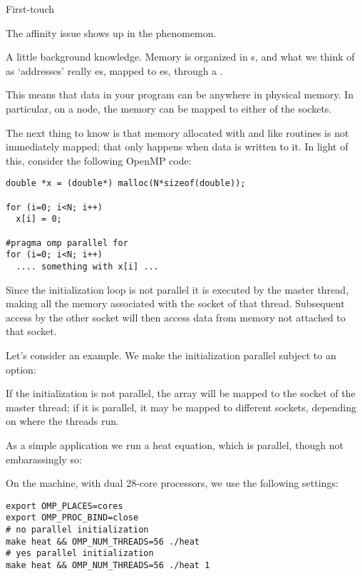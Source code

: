
 {First-touch}
\label{sec:first-touch}

The affinity issue shows up in the 
phenomemon.

A little background knowledge. Memory is organized in
s,
and what we think of as `addresses' really
es,
mapped to es,
through a .

This means that data in your program can be anywhere in physical memory.
In particular, on a  node,
the memory can be mapped to either of the sockets.

The next thing to know is that
memory allocated with  and like
routines is not immediately mapped; that only happens when data is
written to it. In light of this, consider the following OpenMP code:
\begin{lstlisting}
double *x = (double*) malloc(N*sizeof(double));

for (i=0; i<N; i++)
  x[i] = 0;

#pragma omp parallel for
for (i=0; i<N; i++)
  .... something with x[i] ...
\end{lstlisting}
Since the initialization loop is not parallel it is executed by the
master thread, making all the memory associated with the socket of
that thread. Subsequent access by the other socket will then access
data from memory not attached to that socket.

Let's consider an example. We make the initialization
parallel subject to an option:
%

If the initialization is not parallel, the array will be mapped
to the socket of the master thread; if it is parallel,
it may be mapped to different sockets, depending on where the threads run.

As a simple application
we run a heat equation, which is parallel,
though not embarassingly so:
%

On the  machine, with dual 28-core
 processors,
we use the following settings:

\begin{verbatim}
export OMP_PLACES=cores
export OMP_PROC_BIND=close
# no parallel initialization
make heat && OMP_NUM_THREADS=56 ./heat
# yes parallel initialization
make heat && OMP_NUM_THREADS=56 ./heat 1
\end{verbatim}

